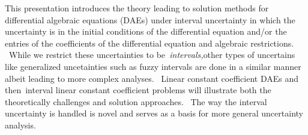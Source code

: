 
This presentation introduces the theory leading to solution methods for
differential algebraic equations (DAEs) under interval uncertainty in which
the uncertainty is in the initial conditions of the differential equation
and/or the entries of the coefficients of the differential equation and
algebraic restrictions. \ While we restrict these uncertainties to
be\textit{\ intervals,}other types of uncertains like generalized uncetainties
such as fuzzy intervals are done in a similar manner albeit leading to more
complex analyses. \ Linear constant coefficient DAEs and then\ interval linear
constant coefficient problems will illustrate both the theoretically
challenges and solution approaches. \ The way the interval uncertainty is
handled is novel and serves as a basis for more general uncertainty analysis.


